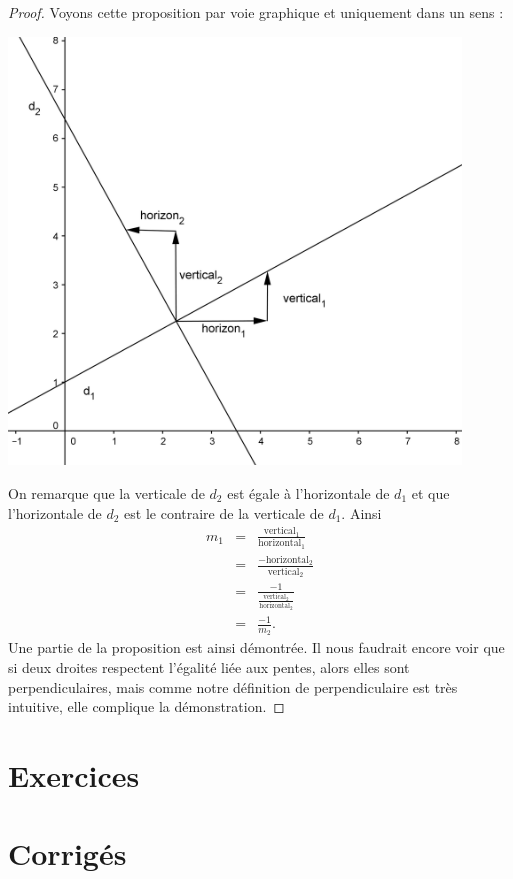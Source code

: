 \begin{proof}
Voyons cette proposition par voie graphique et uniquement dans un sens :
\begin{center}
\includegraphics[width=0.9\textwidth]{droite/perpendiculaire.png}
\end{center}
On remarque que la verticale de $d_2$ est égale à l'horizontale de $d_1$ et que l'horizontale de $d_2$ est le contraire de la verticale de $d_1$.
Ainsi 
$$
\begin{array}{lcl}
m_1 &=& \frac{\mbox{vertical}_1}{\mbox{horizontal}_1}\\
&=& \frac{-\mbox{horizontal}_2}{\mbox{vertical}_2}\\
&=& \frac{-1}{\frac{\mbox{vertical}_2}{\mbox{horizontal}_2}}\\
&=& \frac{-1}{m_2}.
\end{array}
$$
Une partie de la proposition est ainsi démontrée. Il nous faudrait encore voir que si deux droites respectent l'égalité liée aux pentes, alors elles sont perpendiculaires, mais comme notre définition de perpendiculaire est très intuitive, elle complique la démonstration.
\end{proof}

\section{Exercices}



\section{Corrigés}

